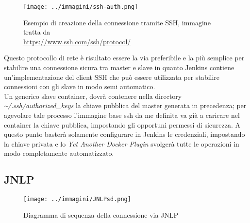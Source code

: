 \begin{figure}[H]
    \capstart
    \label{fig:ssh-connection}
    \captionsetup{justification=centering}
    \centering
    \texttt{[image: ../immagini/ssh-auth.png]}
    \caption[Esempio di creazione della connessione tramite SSH]{Esempio di creazione della connessione tramite SSH, immagine tratta da \\ \url{https://www.ssh.com/ssh/protocol/}}
\end{figure}

Questo protocollo di rete è risultato essere la via preferibile e la più semplice per stabilire una connessione sicura tra master e slave in quanto Jenkins contiene un'implementazione del client SSH che può essere utilizzata per stabilire connessioni con gli slave in modo semi automatico. \\
Un generico slave container, dovrà contenere nella directory \textit{\textasciitilde/.ssh/authorized\_keys} la chiave pubblica del master generata in precedenza; per agevolare tale processo l'immagine base ssh da me definita va già a caricare nel container la chiave pubblica, impostando gli opportuni permessi di sicurezza. A questo punto basterà solamente configurare in Jenkins le credenziali, impostando la chiave privata e lo \textit{Yet Another Docker Plugin} svolgerà tutte le operazioni in modo completamente automatizzato.

\subsection{JNLP}
\label{subsec:jnlp}

\begin{figure}[H]
    \capstart
    \label{fig:ssh-connection}
    \captionsetup{justification=centering}
    \centering
    \texttt{[image: ../immagini/JNLPsd.png]}
    \caption{Diagramma di sequenza della connessione via JNLP}
\end{figure}